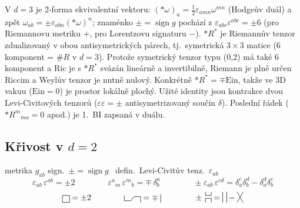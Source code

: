 \begin{vysvetleni}[Proč je v $d=3$ křivost dána Ricciho tenzorem]
V $d=3$ je 2-forma ekvivalentní vektoru: $({*}\omega)_a=\tfrac12\varepsilon_{amn}\omega^{mn}$ (Hodgeův duál) a zpět $\omega_{ab}=\pm\varepsilon_{abn}({*}\omega)^n$; znaménko $\pm=\operatorname{sign}g$ pochází z $\varepsilon_{abc}\varepsilon^{abc}=\pm6$ (pro Riemannovu metriku $+$, pro Lorentzovu signaturu $-$). ${*}R^{*}$ je Riemannův tenzor zdualizovaný v obou antisymetrických párech, tj.\ symetrická $3\times3$ matice (6 komponent = $\#R$ v $d=3$). Protože symetrický tenzor typu (0,2) má také 6 komponent a $\mathrm{Ric}$ je s ${*}R^{*}$ svázán lineárně a invertibilně, Riemann je plně určen Riccim a Weylův tenzor je nutně nulový. Konkrétně ${*}R^{*}=\mp\mathrm{Ein}$, takže ve 3D vakuu ($\mathrm{Ein}=0$) je prostor lokálně plochý.
Užité identity jsou kontrakce dvou Levi-Civitových tenzorů ($\varepsilon\varepsilon=\pm$ antisymetrizovaný součin $\delta$). Poslední řádek (${*}R^{m}{}_{ma}=0$ apod.) je 1.\ BI zapsaná v duálu.
\end{vysvetleni}

\subsection*{Křivost v $d = 2$}
metrika $g_{ab}$ sign.\ $\pm = \operatorname{sign}g$ \ defin.\ Levi-Civitův tenz.\ $\varepsilon_{ab}$
\[
  \varepsilon_{ab}\,\varepsilon^{ab} = \pm 2 \qquad\qquad
  \varepsilon^{a}{}_{m}\,\varepsilon^{m}{}_{b} = \mp\,\delta^{a}_{b} \qquad\qquad
  \pm\varepsilon_{ab}\,\varepsilon^{cd} = \delta^{c}_{a}\delta^{d}_{b} - \delta^{d}_{a}\delta^{c}_{b}
\]
\[
  \gmIjedenactBd{\draw (0,0) rectangle (0.6,0.6);} = \pm 2
  \qquad\qquad
  \gmIjedenactBd{\draw (0,0.6)--(0,0.15)--(0.5,0.15) .. controls (0.7,0.15) and (0.7,0.5) .. (0.9,0.5)--(1.4,0.5)--(1.4,0);}
  = \mp\;\gmIjedenactBd{\draw (0,0)--(0,0.7);}
  \qquad\qquad
  \pm\,\gmIjedenactBd{\draw (0,0.9)--(0,0.6)--(0.5,0.6)--(0.5,0.9); \draw (0,0)--(0,0.35)--(0.5,0.35)--(0.5,0);}
  = \gmIjedenactBd{\draw (0,0)--(0,0.9) (0.35,0)--(0.35,0.9);}
  - \gmIjedenactBd{\draw (0,0)--(0.5,0.9) (0.5,0)--(0,0.9);}
\]

